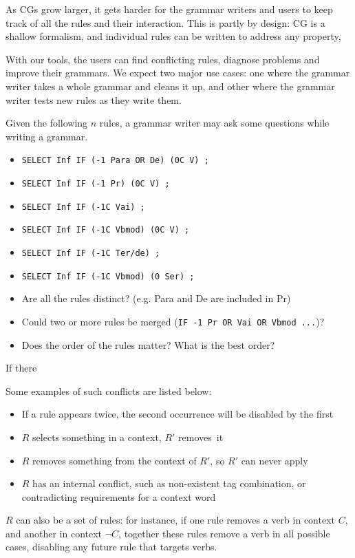 As CGs grow larger, it gets harder for the grammar writers and users
to keep track of all the rules and their interaction.
This is partly by design: CG is a shallow formalism, and individual rules can be written to address any property, 

With our tools, the users can find conflicting rules, diagnose problems and improve their grammars. 
We expect two major use cases: 
one where the grammar writer takes a whole grammar and cleans it up, and
other where the grammar writer tests new rules as they write them. 


Given the following $n$ rules, a grammar writer may ask some questions while writing a grammar. 
\begin{itemize}
\item[] \texttt{SELECT Inf IF (-1 Para OR De) (0C V) ;}
\item[] \texttt{SELECT Inf IF (-1 Pr) (0C V) ;}
\item[] \texttt{SELECT Inf IF (-1C Vai) ;}
\item[] \texttt{SELECT Inf IF (-1C Vbmod) (0C V) ;}
\item[] \texttt{SELECT Inf IF (-1C Ter/de) ;}
\item[] \texttt{SELECT Inf IF (-1C Vbmod) (0 Ser) ;}
\end{itemize}


\begin{itemize}
\item Are all the rules distinct? (e.g. Para and De are included in Pr)
\item Could two or more rules be merged (\texttt{IF -1 Pr OR Vai OR Vbmod ...})?
\item Does the order of the rules matter? What is the best order?
\end{itemize}

If there 




Some examples of such conflicts are listed below:
\begin{itemize}
\item If a rule appears twice, the second occurrence will be disabled by the first
\item $R$ selects something in a context, $R'$ removes~it
\item $R$ removes something from the context of $R'$, so $R'$ can never
  apply
\item $R$ has an internal conflict, such as non-existent
tag combination, or contradicting requirements for a context word
\end{itemize}
$R$ can also be a set of rules: for instance, if one rule removes a verb in
context $C$, and another in context $\neg C$, together these rules
remove a verb in all possible cases, disabling any future rule that
targets verbs.

